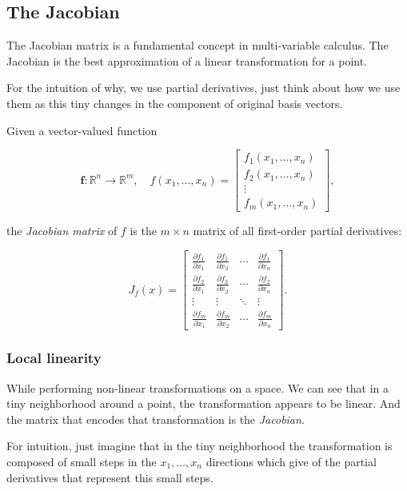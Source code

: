 \subsection{The Jacobian}

The Jacobian matrix is a fundamental concept in multi-variable calculus. The Jacobian is the best
approximation of a linear transformation for a point.

For the intuition of why, we use partial derivatives, just think about
how we use them as this tiny changes in the component of original
basis vectors.

Given a vector-valued function

\[
\mathbf{f} : \mathbb{R}^n \rightarrow \mathbb{R}^m, \quad f(x_1, \ldots, x_n) = 
\begin{bmatrix}
f_1(x_1, \ldots, x_n) \\
f_2(x_1, \ldots, x_n) \\
\vdots \\
f_m(x_1, \ldots, x_n)
\end{bmatrix},
\]

the \emph{Jacobian matrix} of \(f\) is the \(m \times n\) matrix of all first-order partial derivatives:

\[
J_f(x) = \begin{bmatrix}
\frac{\partial f_1}{\partial x_1} & \frac{\partial f_1}{\partial x_2} & \cdots & \frac{\partial f_1}{\partial x_n} \\
\frac{\partial f_2}{\partial x_1} & \frac{\partial f_2}{\partial x_2} & \cdots & \frac{\partial f_2}{\partial x_n} \\
\vdots & \vdots & \ddots & \vdots \\
\frac{\partial f_m}{\partial x_1} & \frac{\partial f_m}{\partial x_2} & \cdots & \frac{\partial f_m}{\partial x_n}
\end{bmatrix}.
\]

\subsubsection{Local linearity}

While performing non-linear transformations on a space. We can see that in a tiny neighborhood
around a point, the transformation appears to be linear. And the matrix that encodes that
transformation is the \emph{Jacobian}.

For intuition, just imagine that in the tiny neighborhood the transformation is composed
of small steps in the \(x_1, \dots, x_n\) directions which give of the partial derivatives that
represent this small steps. 

